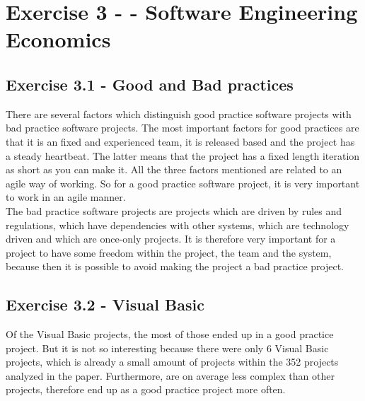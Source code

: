 \documentclass[10pt]{article}
\begin{document}
\section{Exercise 3 - - Software Engineering Economics}
\subsection{Exercise 3.1 - Good and Bad practices}
There are several factors which distinguish good practice software projects with bad practice software projects. The most important factors for good practices are that it is an fixed and experienced team, it is released based and the project has a steady heartbeat. The latter means that the project has a fixed length iteration as short as you can make it. All the three factors mentioned are related to an agile way of working. So for a good practice software project, it is very important to work in an agile manner.\\
The bad practice software projects are projects which are driven by rules and regulations, which have dependencies with other systems, which are technology driven and which are once-only projects. It is therefore very important for a project to have some freedom within the project, the team and the system, because then it is possible to avoid making the project a bad practice project. 

\subsection{Exercise 3.2 - Visual Basic}
Of the Visual Basic projects, the most of those ended up in a good practice project. But it is not so interesting because there were only 6 Visual Basic projects, which is already a small amount of projects within the 352 projects analyzed in the paper. Furthermore, are on average less complex than other projects, therefore end up as a good practice project more often. 
\end{document}
